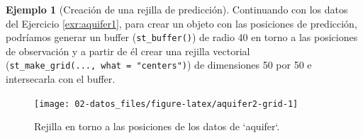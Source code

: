 \documentclass[
  spanish,
]{book}
\newenvironment{Shaded}{\begin{snugshade}}{\end{snugshade}}
\newcommand{\AttributeTok}[1]{\textcolor[rgb]{0.77,0.63,0.00}{#1}}
\newcommand{\CommentTok}[1]{\textcolor[rgb]{0.56,0.35,0.01}{\textit{#1}}}
\newcommand{\ConstantTok}[1]{\textcolor[rgb]{0.00,0.00,0.00}{#1}}
\newcommand{\DecValTok}[1]{\textcolor[rgb]{0.00,0.00,0.81}{#1}}
\newcommand{\FloatTok}[1]{\textcolor[rgb]{0.00,0.00,0.81}{#1}}
\newcommand{\FunctionTok}[1]{\textcolor[rgb]{0.00,0.00,0.00}{#1}}
\newcommand{\NormalTok}[1]{#1}
\newcommand{\OtherTok}[1]{\textcolor[rgb]{0.56,0.35,0.01}{#1}}
\newcommand{\SpecialCharTok}[1]{\textcolor[rgb]{0.00,0.00,0.00}{#1}}
\newcommand{\StringTok}[1]{\textcolor[rgb]{0.31,0.60,0.02}{#1}}
\theoremstyle{break}
\theoremstyle{definition}
\theoremstyle{definition}
\newtheorem{example}{Ejemplo}[chapter]
\theoremstyle{definition}
\theoremstyle{definition}
\theoremstyle{remark}
\begin{document}
\begin{example}[Creación de una rejilla de predicción]
\protect\hypertarget{exm:aquifer2}{}{\label{exm:aquifer2} {} }
Continuando con los datos del Ejercicio \ref{exr:aquifer1}, para crear un objeto con las posiciones de predicción, podríamos generar un buffer (\texttt{st\_buffer()}) de radio 40 en torno a las posiciones de observación y a partir de él crear una rejilla vectorial (\texttt{st\_make\_grid(...,\ what\ =\ "centers")}) de dimensiones 50 por 50 e intersecarla con el buffer.
\end{example}

\begin{Shaded}
\end{Shaded}

\begin{figure}[!htb]

{\centering \texttt{[image: 02-datos\_files/figure-latex/aquifer2-grid-1]} 

}

\caption{Rejilla en torno a las posiciones de los datos de `aquifer`.}\label{fig:aquifer2-grid}
\end{figure}
\end{document}
